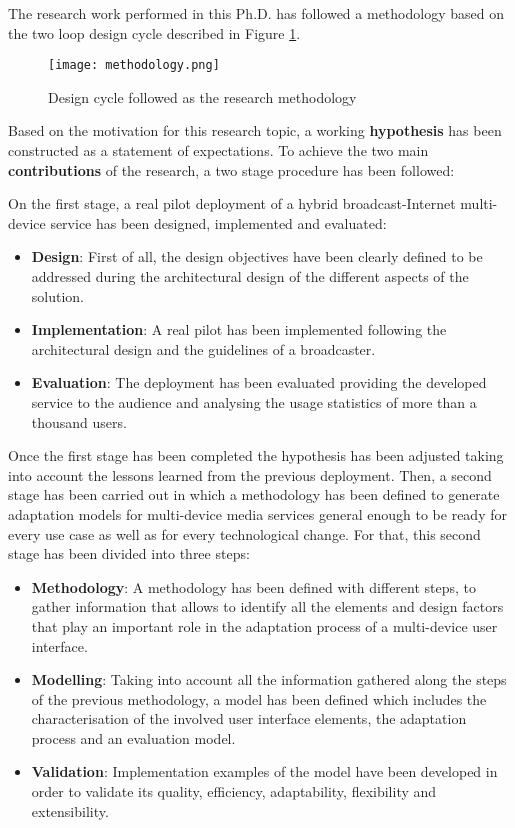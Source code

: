 The research work performed in this Ph.D. has followed a methodology based on the two loop design cycle described in Figure \ref{fig:designcycle}. 
\begin{figure}
	\centering
	\texttt{[image: methodology.png]}
	\caption[Design cycle followed as the research methodology]{Design cycle followed as the research methodology}
	\label{fig:designcycle}
\end{figure}
Based on the motivation for this research topic, a working \textbf{hypothesis} has been constructed as a statement of expectations. To achieve the two main \textbf{contributions} of the research, a two stage procedure has been followed: 

On the first stage, a real pilot deployment of a hybrid broadcast-Internet multi-device service has been designed, implemented and evaluated: 
\begin{itemize}
	\item \textbf{Design}: First of all, the design objectives have been clearly defined to be addressed during the architectural design of the different aspects of the solution.
	\item \textbf{Implementation}: A real pilot has been implemented following the architectural design and the guidelines of a broadcaster.
	\item \textbf{Evaluation}: The deployment has been evaluated providing the developed service to the audience and analysing the usage statistics of more than a thousand users.
\end{itemize}

Once the first stage has been completed the hypothesis has been adjusted taking into account the lessons learned from the previous deployment. Then, a second stage has been carried out in which a methodology has been defined to generate adaptation models for multi-device media services general enough to be ready for  every use case as well as for every technological change. For that, this second stage has been divided into three steps:

\begin{itemize}
	\item \textbf{Methodology}: A methodology has been defined with different steps, to gather information that allows to identify all the elements and design factors that play an important role in the adaptation process of a multi-device user interface. 
	\item \textbf{Modelling}: Taking into account all the information gathered along the steps of the previous methodology, a model has been defined which includes the characterisation of the involved user interface elements, the adaptation process and an evaluation model.
	\item \textbf{Validation}: Implementation examples of the model have been developed in order to validate its quality, efficiency, adaptability, flexibility and extensibility. 
\end{itemize}


